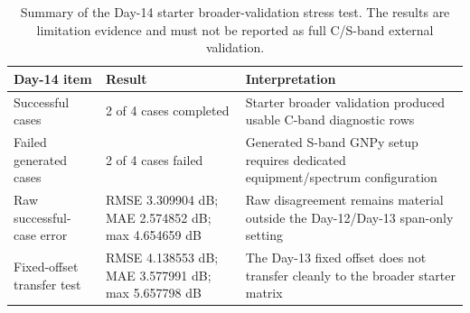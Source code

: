 \begin{table}
\caption{Summary of the Day-14 starter broader-validation stress test. The results are limitation evidence and must not be reported as full C/S-band external validation.}
\label{tab:day14-starter-summary}
\begin{tabular}{lll}
\toprule
Day-14 item & Result & Interpretation \\
\midrule
Successful cases & 2 of 4 cases completed & Starter broader validation produced usable C-band diagnostic rows \\
Failed generated cases & 2 of 4 cases failed & Generated S-band GNPy setup requires dedicated equipment/spectrum configuration \\
Raw successful-case error & RMSE 3.309904 dB; MAE 2.574852 dB; max 4.654659 dB & Raw disagreement remains material outside the Day-12/Day-13 span-only setting \\
Fixed-offset transfer test & RMSE 4.138553 dB; MAE 3.577991 dB; max 5.657798 dB & The Day-13 fixed offset does not transfer cleanly to the broader starter matrix \\
\bottomrule
\end{tabular}
\end{table}
